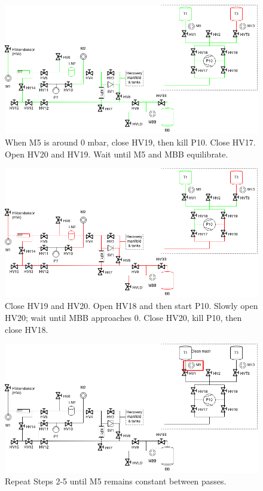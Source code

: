\documentclass[a4paper,10pt]{article}
\begin{document}
\begin{figure}[htbp!]
 \centering
 \includegraphics[width=\textwidth]{./mash-cleaning-04.png}
 \caption{When M5 is around 0 mbar, close HV19, then kill P10.  Close HV17.  Open HV20 and HV19.  Wait until M5 and MBB equilibrate.}
 \label{d}
\end{figure}


\begin{figure}[htbp!]
 \centering
 \includegraphics[width=\textwidth]{./mash-cleaning-05.png}
 \caption{Close HV19 and HV20.  Open HV18 and then start P10.  Slowly open HV20; wait until MBB approaches 0.  Close HV20, kill P10, then close HV18.}
 \label{e}
\end{figure}

\begin{figure}[htbp!]
 \centering
 \includegraphics[width=\textwidth]{./mash-cleaning-06.png}
 \caption{Repeat Steps 2-5 until M5 remains constant between passes.}
 \label{f}
\end{figure}
\end{document}
